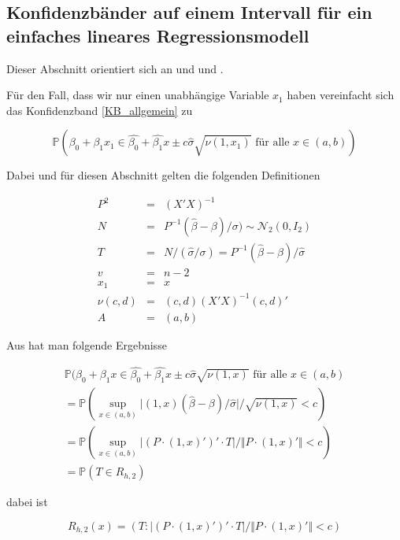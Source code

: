 \documentclass[12pt,a4paper]{article}
\theoremstyle{definition}
\theoremstyle{definition}
\theoremstyle{definition}
\theoremstyle{definition}
\begin{document}
\subsection{Konfidenzbänder auf einem Intervall für ein einfaches lineares Regressionsmodell}
\label{Konfidenzbänder auf einem Intervall für ein einfaches lineares Regressionsmodell}
Dieser Abschnitt orientiert sich an \cite[17-23]{Liu64} und \cite{Liu08} und \cite{Wynn71}.

Für den Fall, dass wir nur einen unabhängige Variable $x_1$ haben vereinfacht sich das Konfidenzband \ref{KB_allgemein} zu

\begin{equation}\label{simple_KB}
\mathbb{P}(\beta_0 + \beta_1 x_1 \in \hat{\beta_0} + \hat{\beta_1} x \pm c \hat{\sigma} \sqrt{\nu(1,x_1)}  \text{ für alle } x \in (a,b) )
\end{equation}

Dabei und für diesen Abschnitt gelten die folgenden Definitionen

\begin{eqnarray*}
P^2 &=& (X'X)^{-1} \\
N &=& P^{-1} (\hat{\beta} - \beta)/\sigma) \sim \mathscr{N}_{2}(0,I_2) \\
T &=& N / (\hat{\sigma} / \sigma) = P^{-1} (\hat{\beta}-\beta) / \hat{\sigma} \\
v &=& n-2 \\
x_1 &=& x \\
\nu(c,d) &=& (c,d) (X'X)^{-1} (c,d)' \\
A &=&(a,b)
\end{eqnarray*}

Aus \cite[19-20]{Liu64} hat man folgende Ergebnisse

\begin{eqnarray*}
\mathbb{P}(\beta_0 + \beta_1 x \in \hat{\beta_0} + \hat{\beta_1} x \pm c \hat{\sigma} \sqrt{\nu(1,x)}  \text{ für alle } x \in (a,b)  \\
= \mathbb{P} (\sup_{x \in (a,b)} \vert (1,x) ( \hat{\beta} - \beta ) / \hat{\sigma} \vert / \sqrt{\nu(1,x)} < c) \\
= \mathbb{P} (\sup_{x \in (a,b)} \vert (P \cdot (1,x)')' \cdot T \vert / \Vert P \cdot (1,x)' \Vert < c) \\
= \mathbb{P} (T \in R_{h,2})
\end{eqnarray*}

dabei ist

\begin{equation*}
R_{h,2}(x) = ( T : \vert (P \cdot (1,x)' )' \cdot T \vert / \Vert P \cdot (1,x)' \Vert < c)
\end{equation*}
\end{document}
